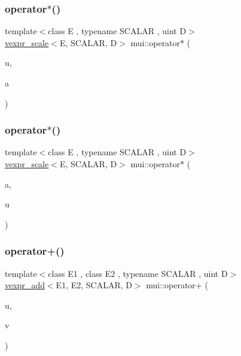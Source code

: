 \subsubsection{\texorpdfstring{operator$\ast$()}{operator*()}\hspace{0.1cm}{\footnotesize\ttfamily [2/3]}}
{\footnotesize\ttfamily template$<$class E , typename S\+C\+A\+L\+AR , uint D$>$ \\
\hyperlink{structmui_1_1vexpr__scale}{vexpr\+\_\+scale}$<$E, S\+C\+A\+L\+AR, D$>$ mui\+::operator$\ast$ (\begin{DoxyParamCaption}\item[{\hyperlink{structmui_1_1vexpr}{vexpr}$<$ E, S\+C\+A\+L\+AR, D $>$ const \&}]{u,  }\item[{S\+C\+A\+L\+AR const}]{a }\end{DoxyParamCaption})\hspace{0.3cm}{\ttfamily [inline]}}

\mbox{\label{namespacemui_aeac1932edc8db70bcba418c8acea214a}} 
\subsubsection{\texorpdfstring{operator$\ast$()}{operator*()}\hspace{0.1cm}{\footnotesize\ttfamily [3/3]}}
{\footnotesize\ttfamily template$<$class E , typename S\+C\+A\+L\+AR , uint D$>$ \\
\hyperlink{structmui_1_1vexpr__scale}{vexpr\+\_\+scale}$<$E, S\+C\+A\+L\+AR, D$>$ mui\+::operator$\ast$ (\begin{DoxyParamCaption}\item[{S\+C\+A\+L\+AR const}]{a,  }\item[{\hyperlink{structmui_1_1vexpr}{vexpr}$<$ E, S\+C\+A\+L\+AR, D $>$ const \&}]{u }\end{DoxyParamCaption})\hspace{0.3cm}{\ttfamily [inline]}}

\mbox{\label{namespacemui_a8f282990f9dab2d809dc062d6142e212}} 
\subsubsection{\texorpdfstring{operator+()}{operator+()}}
{\footnotesize\ttfamily template$<$class E1 , class E2 , typename S\+C\+A\+L\+AR , uint D$>$ \\
\hyperlink{structmui_1_1vexpr__add}{vexpr\+\_\+add}$<$E1, E2, S\+C\+A\+L\+AR, D$>$ mui\+::operator+ (\begin{DoxyParamCaption}\item[{\hyperlink{structmui_1_1vexpr}{vexpr}$<$ E1, S\+C\+A\+L\+AR, D $>$ const \&}]{u,  }\item[{\hyperlink{structmui_1_1vexpr}{vexpr}$<$ E2, S\+C\+A\+L\+AR, D $>$ const \&}]{v }\end{DoxyParamCaption})\hspace{0.3cm}{\ttfamily [inline]}}

